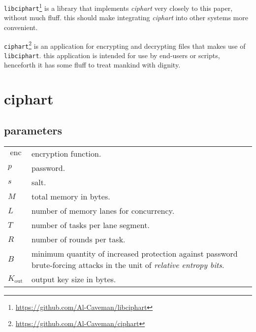 \documentclass[twocolumn]{article}
\DeclareMathOperator{\enc}{enc}
\begin{document}
\texttt{libciphart}\footnote{\url{https://github.com/Al-Caveman/libciphart}}
is a library that implements \emph{ciphart} very closely to this paper,
without much fluff.  this should make integrating \emph{ciphart} into other
systems more convenient.

\texttt{ciphart}\footnote{\url{https://github.com/Al-Caveman/ciphart}} is
an application for encrypting and decrypting files that makes use of
\texttt{libciphart}.  this application is intended for use by end-users or
scripts, henceforth it has some fluff to treat mankind with dignity.
\vfill
\break

\tableofcontents

\section{ciphart}
\subsection{parameters}
\begin{tabularx}{\columnwidth}{lX}
    $\enc$ & encryption function.\\
    $p$ & password.\\
    $s$ & salt.\\
    $M$ & total memory in bytes.\\
    $L$ & number of memory lanes for concurrency.\\
    $T$ & number of tasks per lane segment.\\
    $R$ & number of rounds per task.\\
    $B$ & minimum quantity of increased protection against password
            brute-forcing attacks in the unit of \emph{relative entropy
            bits}.\\
    $K_{\text{out}}$ & output key size in bytes.\\
\end{tabularx}
\end{document}
